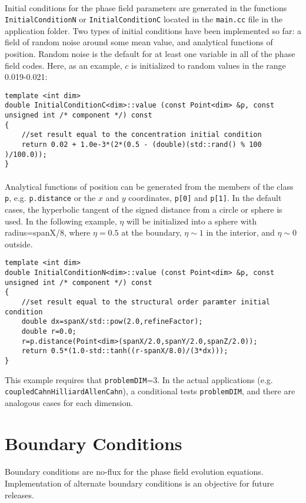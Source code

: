 \documentclass[11pt]{article}
\begin{document}
\paragraph{}
Initial conditions for the phase field parameters are generated in the functions \\ \texttt{InitialConditionN} or \texttt{InitialConditionC} located in the \texttt{main.cc} file in the application folder.  Two types of initial conditions have been implemented so far: a field of random noise around some mean value, and analytical functions of position.  Random noise is the default for at least one variable in all of the phase field codes.  Here, as an example, $c$ is initialized to random values in the range 0.019-0.021:
\begin{lstlisting}
template <int dim>
double InitialConditionC<dim>::value (const Point<dim> &p, const unsigned int /* component */) const
{
	//set result equal to the concentration initial condition
	return 0.02 + 1.0e-3*(2*(0.5 - (double)(std::rand() % 100 )/100.0));
}
\end{lstlisting}
\paragraph{}
Analytical functions of position can be generated from the members of the class \texttt{p}, e.g. \texttt{p.distance} or the $x$ and $y$ coordinates, \texttt{p[0]} and \texttt{p[1]}.  In the default cases,  the hyperbolic tangent of the signed distance from a circle or sphere is used.  In the following example, $\eta$ will be initialized into a sphere with radius=spanX/8, where $\eta=0.5$ at the boundary, $\eta \sim 1$ in the interior, and $\eta \sim 0$ outside.
\begin{lstlisting}
template <int dim>
double InitialConditionN<dim>::value (const Point<dim> &p, const unsigned int /* component */) const
{
	//set result equal to the structural order paramter initial condition
	double dx=spanX/std::pow(2.0,refineFactor);
	double r=0.0;
	r=p.distance(Point<dim>(spanX/2.0,spanY/2.0,spanZ/2.0));
	return 0.5*(1.0-std::tanh((r-spanX/8.0)/(3*dx)));
}
\end{lstlisting}
This example requires that \texttt{problemDIM}=3.  In the actual applications (e.g. \\\texttt{coupledCahnHilliardAllenCahn}), a conditional tests  \texttt{problemDIM}, and there are analogous cases for each dimension.


\section{Boundary Conditions}
\paragraph{}
Boundary conditions are no-flux for the phase field evolution equations.  Implementation of alternate boundary conditions is an objective for future releases.
\end{document}
